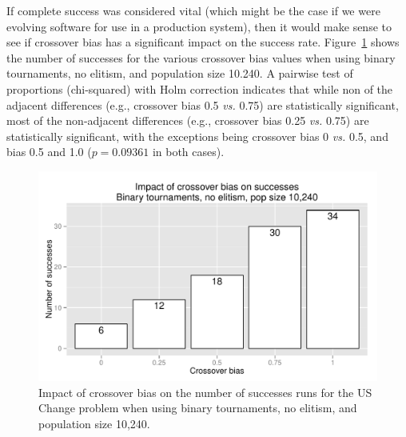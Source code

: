 \documentclass{sig-alternate}
\begin{document}
%
%
%
%

If complete success was considered vital (which might be the case if we were evolving software for use in a 
production system), then it would make sense to see if crossover bias has a significant impact on the success rate. 
Figure~\ref{fig:USChange_Successes_strong} shows the number of successes for the various crossover bias values 
when using binary tournaments, no elitism, and population size 10.240. A pairwise test of proportions (chi-squared) 
with Holm correction indicates that while non of the adjacent differences (e.g., crossover bias 0.5 \emph{vs.} 0.75) are 
statistically significant, most of the non-adjacent differences (e.g., crossover bias 0.25 \emph{vs.} 0.75) are 
statistically significant, with the exceptions being crossover bias 0 \emph{vs.} 0.5, and bias 0.5 and 1.0 ($p=0.09361$ 
in both cases). 

\begin{figure}
\centering
\includegraphics[width=0.45 \textwidth]{Plots/US_change_successes_strong.pdf}
\caption{Impact of crossover bias on the number of successes runs for the US Change problem when using 
binary tournaments, no elitism, and population size 10,240.}
\label{fig:USChange_Successes_strong}
\end{figure}

%
%
%
%

\end{document}
